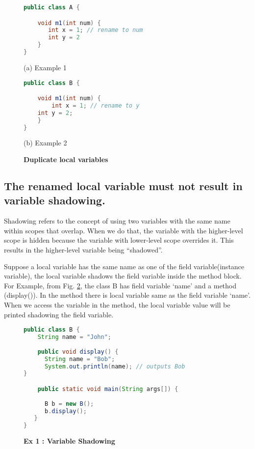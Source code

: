 \begin{figure}[th]
\centering
\begin{minipage}[t]{0.8\linewidth}
\begin{lstlisting}[language=java, basicstyle=\scriptsize\ttfamily,frame=single]
public class A {

    void m1(int num) {
       int x = 1; // rename to num
       int y = 2
    }
}
\end{lstlisting}
\centering(a) Example 1
\end{minipage}
\hfill
\begin{minipage}[t]{0.8\linewidth}
\begin{lstlisting}[language=java, basicstyle=\scriptsize\ttfamily,frame=single]
public class B {

    void m1(int num) {
        int x = 1; // rename to y
	int y = 2;
    }
}
\end{lstlisting}
\centering(b) Example 2
\end{minipage}
\caption{\textbf{Duplicate local variables}}
\label{figure:precond5_1}
\end{figure}

\subsection{The renamed local variable must not result in variable shadowing.}
Shadowing refers to the concept of using two variables with the same name within scopes that overlap. When we do that, the variable with the higher-level scope is hidden because the variable with lower-level scope overrides it. This results in the higher-level variable being ``shadowed''. 

Suppose a local variable has the same name as one of the field variable(instance variable), the local variable shadows the field variable inside the method block. For Example, from Fig. \ref{figure:precond5_2},  the class B has  field variable `name' and a method (display()). In the method there is local variable same as the field variable `name'. When we access the variable in the method, the local variable value will be printed shadowing the field variable.

\begin{figure}[th]
\centering
\begin{minipage}[t]{0.8\linewidth}
\begin{lstlisting}[language=java, basicstyle=\scriptsize\ttfamily,frame=single]
public class B {
    String name = "John";
    
    public void display() {
      String name = "Bob";
      System.out.println(name); // outputs Bob		
}

    public static void main(String args[]) {
    
      B b = new B();
      b.display();	
   }
}
\end{lstlisting}
\end{minipage}
\caption{\textbf{Ex 1 : Variable Shadowing}}
\label{figure:precond5_2}
\end{figure}

